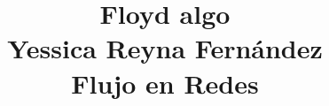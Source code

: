 \documentclass[12pt]{article}
\begin{document}
\title{{\LARGE \textbf{Floyd algo}}\\ {\large Yessica Reyna Fernández}\\{\large Flujo en Redes}}
\maketitle
\end{document}
